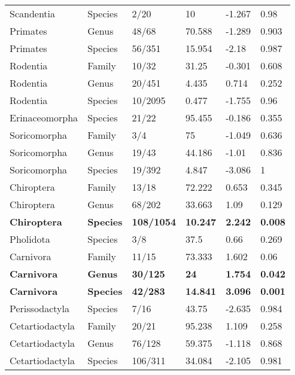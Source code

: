\begin{longtable}{llllll}
  Scandentia & Species & 2/20 & 10 & -1.267 & 0.98 \\ 
  Primates & Genus & 48/68 & 70.588 & -1.289 & 0.903 \\ 
  Primates & Species & 56/351 & 15.954 & -2.18 & 0.987 \\ 
  Rodentia & Family & 10/32 & 31.25 & -0.301 & 0.608 \\ 
  Rodentia & Genus & 20/451 & 4.435 & 0.714 & 0.252 \\ 
  Rodentia & Species & 10/2095 & 0.477 & -1.755 & 0.96 \\ 
  Erinaceomorpha & Species & 21/22 & 95.455 & -0.186 & 0.355 \\ 
  Soricomorpha & Family & 3/4 & 75 & -1.049 & 0.636 \\ 
  Soricomorpha & Genus & 19/43 & 44.186 & -1.01 & 0.836 \\ 
  Soricomorpha & Species & 19/392 & 4.847 & -3.086 & 1 \\ 
  Chiroptera & Family & 13/18 & 72.222 & 0.653 & 0.345 \\ 
  Chiroptera & Genus & 68/202 & 33.663 & 1.09 & 0.129 \\ 
  \textbf{Chiroptera} & \textbf{Species} & \textbf{108/1054} & \textbf{10.247} & \textbf{2.242} & \textbf{0.008} \\ 
  Pholidota & Species & 3/8 & 37.5 & 0.66 & 0.269 \\ 
  Carnivora & Family & 11/15 & 73.333 & 1.602 & 0.06 \\ 
  \textbf{Carnivora} & \textbf{Genus} & \textbf{30/125} & \textbf{24} & \textbf{1.754} & \textbf{0.042} \\ 
  \textbf{Carnivora} & \textbf{Species} & \textbf{42/283} & \textbf{14.841} & \textbf{3.096} & \textbf{0.001} \\ 
  Perissodactyla & Species & 7/16 & 43.75 & -2.635 & 0.984 \\ 
  Cetartiodactyla & Family & 20/21 & 95.238 & 1.109 & 0.258 \\ 
  Cetartiodactyla & Genus & 76/128 & 59.375 & -1.118 & 0.868 \\ 
  Cetartiodactyla & Species & 106/311 & 34.084 & -2.105 & 0.981 \\ 
   \hline
\hline
\end{longtable}
